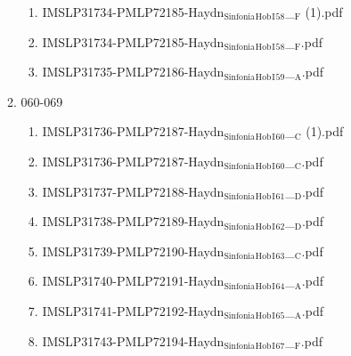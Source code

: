 \documentclass[11pt]{article}
\begin{document}
\begin{enumerate}
\begin{enumerate}
\begin{enumerate}
\item IMSLP31734-PMLP72185-Haydn$_{\text{Sinfonia}}$$_{\text{Hob}}$$_{\text{I}}$$_{\text{58}}$\_$_{\text{F}}$ (1).pdf
\label{sec-1-1-1-1-44-38-7-6-9}

\item IMSLP31734-PMLP72185-Haydn$_{\text{Sinfonia}}$$_{\text{Hob}}$$_{\text{I}}$$_{\text{58}}$\_$_{\text{F}}$.pdf
\label{sec-1-1-1-1-44-38-7-6-10}

\item IMSLP31735-PMLP72186-Haydn$_{\text{Sinfonia}}$$_{\text{Hob}}$$_{\text{I}}$$_{\text{59}}$\_$_{\text{A}}$.pdf
\label{sec-1-1-1-1-44-38-7-6-11}
\end{enumerate}

\item 060-069
\label{sec-1-1-1-1-44-38-7-7}
\begin{enumerate}
\item IMSLP31736-PMLP72187-Haydn$_{\text{Sinfonia}}$$_{\text{Hob}}$$_{\text{I}}$$_{\text{60}}$\_$_{\text{C}}$ (1).pdf
\label{sec-1-1-1-1-44-38-7-7-1}

\item IMSLP31736-PMLP72187-Haydn$_{\text{Sinfonia}}$$_{\text{Hob}}$$_{\text{I}}$$_{\text{60}}$\_$_{\text{C}}$.pdf
\label{sec-1-1-1-1-44-38-7-7-2}

\item IMSLP31737-PMLP72188-Haydn$_{\text{Sinfonia}}$$_{\text{Hob}}$$_{\text{I}}$$_{\text{61}}$\_$_{\text{D}}$.pdf
\label{sec-1-1-1-1-44-38-7-7-3}

\item IMSLP31738-PMLP72189-Haydn$_{\text{Sinfonia}}$$_{\text{Hob}}$$_{\text{I}}$$_{\text{62}}$\_$_{\text{D}}$.pdf
\label{sec-1-1-1-1-44-38-7-7-4}

\item IMSLP31739-PMLP72190-Haydn$_{\text{Sinfonia}}$$_{\text{Hob}}$$_{\text{I}}$$_{\text{63}}$\_$_{\text{C}}$.pdf
\label{sec-1-1-1-1-44-38-7-7-5}

\item IMSLP31740-PMLP72191-Haydn$_{\text{Sinfonia}}$$_{\text{Hob}}$$_{\text{I}}$$_{\text{64}}$\_$_{\text{A}}$.pdf
\label{sec-1-1-1-1-44-38-7-7-6}

\item IMSLP31741-PMLP72192-Haydn$_{\text{Sinfonia}}$$_{\text{Hob}}$$_{\text{I}}$$_{\text{65}}$\_$_{\text{A}}$.pdf
\label{sec-1-1-1-1-44-38-7-7-7}

\item IMSLP31743-PMLP72194-Haydn$_{\text{Sinfonia}}$$_{\text{Hob}}$$_{\text{I}}$$_{\text{67}}$\_$_{\text{F}}$.pdf
\label{sec-1-1-1-1-44-38-7-7-8}


\end{enumerate}
\end{enumerate}
\end{enumerate}
\end{document}
